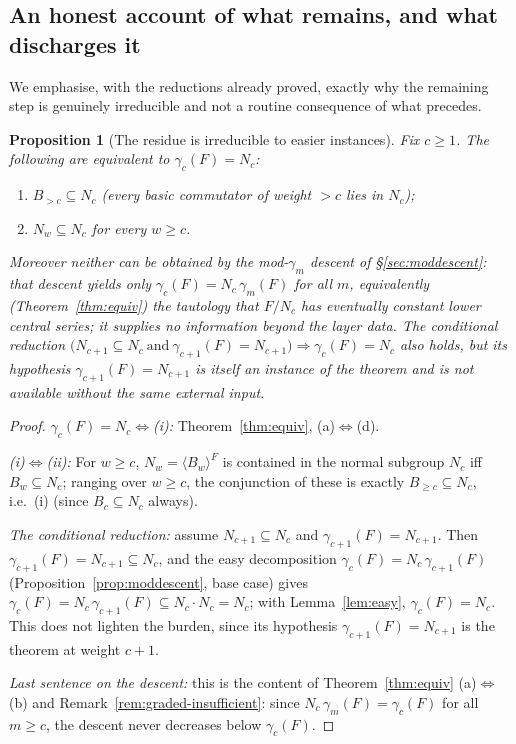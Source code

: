 \documentclass{amsart}
\newtheorem{proposition}{Proposition}
\theoremstyle{definition}
\theoremstyle{remark}
\begin{document}
\subsection{An honest account of what remains, and what discharges it}

We emphasise, with the reductions already proved, exactly why the remaining step is
genuinely irreducible and not a routine consequence of what precedes.

\begin{proposition}[The residue is irreducible to easier instances]
\label{prop:irreducible}
Fix $c\ge1$. The following are equivalent to $\gamma_c(F)=N_c$:
\begin{enumerate}
\item[(i)] $B_{>c}\subseteq N_c$ (every basic commutator of weight $>c$ lies in
$N_c$);
\item[(ii)] $N_w\subseteq N_c$ for every $w\ge c$.
\end{enumerate}
Moreover neither can be obtained by the mod-$\gamma_m$ descent of
\S\ref{sec:moddescent}: that descent yields only $\gamma_c(F)=N_c\,\gamma_m(F)$ for
all $m$, equivalently (Theorem~\ref{thm:equiv}) the \emph{tautology} that
$F/N_c$ has eventually constant lower central series; it supplies no information
beyond the layer data. The conditional reduction
$\bigl(N_{c+1}\subseteq N_c\ \text{and}\ \gamma_{c+1}(F)=N_{c+1}\bigr)\Rightarrow
\gamma_c(F)=N_c$ also holds, but its hypothesis $\gamma_{c+1}(F)=N_{c+1}$ is itself
an instance of the theorem and is not available without the same external input.
\end{proposition}

\begin{proof}
\emph{$\gamma_c(F)=N_c\Leftrightarrow$(i):} Theorem~\ref{thm:equiv}, (a)$\Leftrightarrow$(d).

\emph{(i)$\Leftrightarrow$(ii):} For $w\ge c$, $N_w=\langle B_w\rangle^{F}$ is
contained in the normal subgroup $N_c$ iff $B_w\subseteq N_c$; ranging over
$w\ge c$, the conjunction of these is exactly $B_{\ge c}\subseteq N_c$, i.e.\ (i)
(since $B_c\subseteq N_c$ always).

\emph{The conditional reduction:} assume $N_{c+1}\subseteq N_c$ and
$\gamma_{c+1}(F)=N_{c+1}$. Then $\gamma_{c+1}(F)=N_{c+1}\subseteq N_c$, and the easy
decomposition $\gamma_c(F)=N_c\,\gamma_{c+1}(F)$ (Proposition~\ref{prop:moddescent},
base case) gives $\gamma_c(F)=N_c\,\gamma_{c+1}(F)\subseteq N_c\cdot N_c=N_c$; with
Lemma~\ref{lem:easy}, $\gamma_c(F)=N_c$. This does not lighten the burden, since its
hypothesis $\gamma_{c+1}(F)=N_{c+1}$ is the theorem at weight $c+1$.

\emph{Last sentence on the descent:} this is the content of
Theorem~\ref{thm:equiv} (a)$\Leftrightarrow$(b) and
Remark~\ref{rem:graded-insufficient}: since $N_c\,\gamma_m(F)=\gamma_c(F)$ for all
$m\ge c$, the descent never decreases below $\gamma_c(F)$.
\end{proof}
\end{document}
